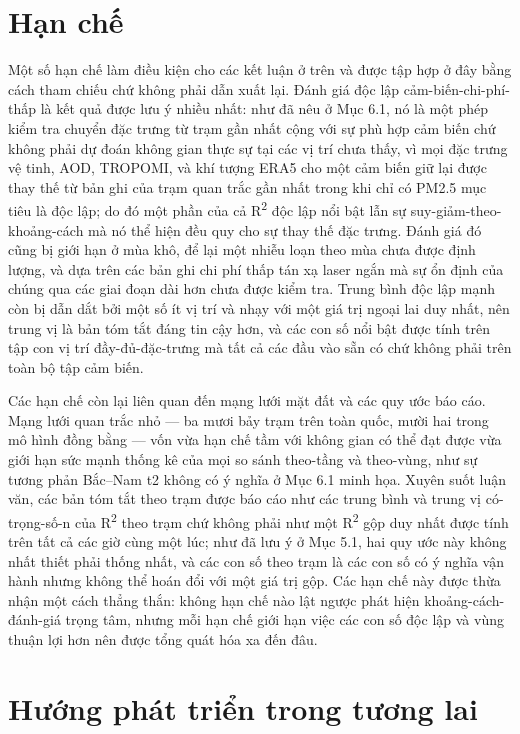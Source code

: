 \section{Hạn chế}

Một số hạn chế làm điều kiện cho các kết luận ở trên và được tập hợp ở đây bằng cách tham chiếu chứ không phải dẫn xuất lại. Đánh giá độc lập cảm-biến-chi-phí-thấp là kết quả được lưu ý nhiều nhất: như đã nêu ở Mục 6.1, nó là một phép kiểm tra chuyển đặc trưng từ trạm gần nhất cộng với sự phù hợp cảm biến chứ không phải dự đoán không gian thực sự tại các vị trí chưa thấy, vì mọi đặc trưng vệ tinh, AOD, TROPOMI, và khí tượng ERA5 cho một cảm biến giữ lại được thay thế từ bản ghi của trạm quan trắc gần nhất trong khi chỉ có PM2.5 mục tiêu là độc lập; do đó một phần của cả R\textsuperscript{2} độc lập nổi bật lẫn sự suy-giảm-theo-khoảng-cách mà nó thể hiện đều quy cho sự thay thế đặc trưng. Đánh giá đó cũng bị giới hạn ở mùa khô, để lại một nhiễu loạn theo mùa chưa được định lượng, và dựa trên các bản ghi chi phí thấp tán xạ laser ngắn mà sự ổn định của chúng qua các giai đoạn dài hơn chưa được kiểm tra. Trung bình độc lập mạnh còn bị dẫn dắt bởi một số ít vị trí và nhạy với một giá trị ngoại lai duy nhất, nên trung vị là bản tóm tắt đáng tin cậy hơn, và các con số nổi bật được tính trên tập con vị trí đầy-đủ-đặc-trưng mà tất cả các đầu vào sẵn có chứ không phải trên toàn bộ tập cảm biến.

Các hạn chế còn lại liên quan đến mạng lưới mặt đất và các quy ước báo cáo. Mạng lưới quan trắc nhỏ --- ba mươi bảy trạm trên toàn quốc, mười hai trong mô hình đồng bằng --- vốn vừa hạn chế tầm với không gian có thể đạt được vừa giới hạn sức mạnh thống kê của mọi so sánh theo-tầng và theo-vùng, như sự tương phản Bắc--Nam t2 không có ý nghĩa ở Mục 6.1 minh họa. Xuyên suốt luận văn, các bản tóm tắt theo trạm được báo cáo như các trung bình và trung vị có-trọng-số-n của R\textsuperscript{2} theo trạm chứ không phải như một R\textsuperscript{2} gộp duy nhất được tính trên tất cả các giờ cùng một lúc; như đã lưu ý ở Mục 5.1, hai quy ước này không nhất thiết phải thống nhất, và các con số theo trạm là các con số có ý nghĩa vận hành nhưng không thể hoán đổi với một giá trị gộp. Các hạn chế này được thừa nhận một cách thẳng thắn: không hạn chế nào lật ngược phát hiện khoảng-cách-đánh-giá trọng tâm, nhưng mỗi hạn chế giới hạn việc các con số độc lập và vùng thuận lợi hơn nên được tổng quát hóa xa đến đâu.

\section{Hướng phát triển trong tương lai}

